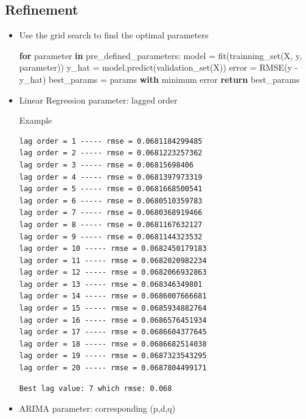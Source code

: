 \documentclass[11pt]{article}
\newenvironment{Shaded}{}{}
\newcommand{\KeywordTok}[1]{\textcolor[rgb]{0.00,0.44,0.13}{\textbf{{#1}}}}
\newcommand{\NormalTok}[1]{{#1}}
\newcommand{\ControlFlowTok}[1]{\textcolor[rgb]{0.00,0.44,0.13}{\textbf{{#1}}}}
\newcommand{\OperatorTok}[1]{\textcolor[rgb]{0.40,0.40,0.40}{{#1}}}
\begin{document}
\subsection{Refinement}\label{refinement}

\begin{itemize}
\item
  Use the grid search to find the optimal parameters

\begin{Shaded}
\begin{Highlighting}[]
\ControlFlowTok{for}\NormalTok{ parameter }\KeywordTok{in}\NormalTok{ pre_defined_parameters:}
\NormalTok{    model }\OperatorTok{=}\NormalTok{ fit(trainning_set(X, y, parameter))}
\NormalTok{    y_hat }\OperatorTok{=}\NormalTok{ model.predict(validation_set(X))}
\NormalTok{    error }\OperatorTok{=}\NormalTok{ RMSE(y }\OperatorTok{-}\NormalTok{ y_hat)}
\NormalTok{    best_params }\OperatorTok{=}\NormalTok{ params }\ControlFlowTok{with}\NormalTok{ minimum error}
\ControlFlowTok{return}\NormalTok{ best_params}
\end{Highlighting}
\end{Shaded}
\item
  Linear Regression parameter: lagged order

  Example

\begin{verbatim}
lag order = 1 ----- rmse = 0.0681184299485
lag order = 2 ----- rmse = 0.0681223257362
lag order = 3 ----- rmse = 0.06815698406
lag order = 4 ----- rmse = 0.0681397973319
lag order = 5 ----- rmse = 0.0681668500541
lag order = 6 ----- rmse = 0.0680510359783
lag order = 7 ----- rmse = 0.0680368919466
lag order = 8 ----- rmse = 0.0681167632127
lag order = 9 ----- rmse = 0.0681144323532
lag order = 10 ----- rmse = 0.0682450179183
lag order = 11 ----- rmse = 0.0682020982234
lag order = 12 ----- rmse = 0.0682066932863
lag order = 13 ----- rmse = 0.068346349801
lag order = 14 ----- rmse = 0.0686007666681
lag order = 15 ----- rmse = 0.0685934882764
lag order = 16 ----- rmse = 0.0686576451934
lag order = 17 ----- rmse = 0.0686604377645
lag order = 18 ----- rmse = 0.0686682514038
lag order = 19 ----- rmse = 0.0687323543295
lag order = 20 ----- rmse = 0.0687804499171
\end{verbatim}

\begin{verbatim}
Best lag value: 7 which rmse: 0.068
\end{verbatim}
\item
  ARIMA parameter: corresponding (p,d,q)


\end{itemize}
\end{document}
